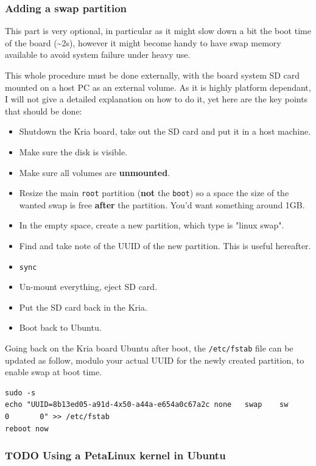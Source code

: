 \documentclass[10pt]{article}
\begin{document}
\subsubsection{Adding a swap partition}
\label{sec:org19e5eb6}
This part is very optional, in particular as it might slow down a bit the
boot time of the board (\textasciitilde{}2s), however it might become handy to have swap memory
available to avoid system failure under heavy use.

This whole procedure must be done externally, with the board system SD card
mounted on a host PC as an external volume.  As it is highly platform dependant,
I will not give a detailed explanation on how to do it, yet here are the key
points that should be done:
\begin{itemize}
\item Shutdown the Kria board, take out the SD card and put it in a host machine.
\item Make sure the disk is visible.
\item Make sure all volumes are \textbf{unmounted}.
\item Resize the main \texttt{root} partition (\textbf{not} the \texttt{boot}) so a space the size of the
wanted swap is free \textbf{after} the partition. You'd want something around 1GB.
\item In the empty space, create a new partition, which type is "linux swap".
\item Find and take note of the UUID of the new partition. This is useful hereafter.
\item \texttt{sync}
\item Un-mount everything, eject SD card.
\item Put the SD card back in the Kria.
\item Boot back to Ubuntu.
\end{itemize}

Going back on the Kria board Ubuntu after boot, the \texttt{/etc/fstab} file can be
updated as follow, modulo your actual UUID for the newly created partition, to
enable swap at boot time.
\begin{verbatim}
sudo -s
echo "UUID=8b13ed05-a91d-4x50-a44a-e654a0c67a2c none   swap    sw      0       0" >> /etc/fstab
reboot now
\end{verbatim}

\subsubsection{{\bfseries\sffamily TODO} Using a PetaLinux kernel in Ubuntu}
\label{sec:org2da1c58}
\clearpage
\end{document}
